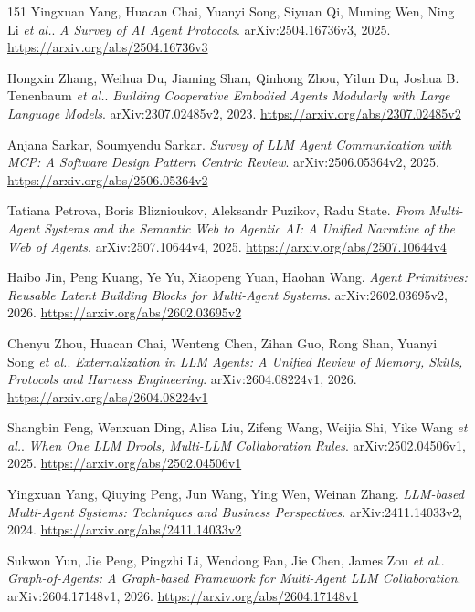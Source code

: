 \documentclass[11pt,a4paper]{article}
\begin{document}
\begin{thebibliography}{151}
Yingxuan Yang, Huacan Chai, Yuanyi Song, Siyuan Qi, Muning Wen, Ning Li \emph{et al.}.
\newblock \emph{A Survey of AI Agent Protocols}.
\newblock arXiv:2504.16736v3, 2025.
\newblock \url{https://arxiv.org/abs/2504.16736v3}

Hongxin Zhang, Weihua Du, Jiaming Shan, Qinhong Zhou, Yilun Du, Joshua B. Tenenbaum \emph{et al.}.
\newblock \emph{Building Cooperative Embodied Agents Modularly with Large Language Models}.
\newblock arXiv:2307.02485v2, 2023.
\newblock \url{https://arxiv.org/abs/2307.02485v2}

Anjana Sarkar, Soumyendu Sarkar.
\newblock \emph{Survey of LLM Agent Communication with MCP: A Software Design Pattern Centric Review}.
\newblock arXiv:2506.05364v2, 2025.
\newblock \url{https://arxiv.org/abs/2506.05364v2}

Tatiana Petrova, Boris Bliznioukov, Aleksandr Puzikov, Radu State.
\newblock \emph{From Multi-Agent Systems and the Semantic Web to Agentic AI: A Unified Narrative of the Web of Agents}.
\newblock arXiv:2507.10644v4, 2025.
\newblock \url{https://arxiv.org/abs/2507.10644v4}

Haibo Jin, Peng Kuang, Ye Yu, Xiaopeng Yuan, Haohan Wang.
\newblock \emph{Agent Primitives: Reusable Latent Building Blocks for Multi-Agent Systems}.
\newblock arXiv:2602.03695v2, 2026.
\newblock \url{https://arxiv.org/abs/2602.03695v2}

Chenyu Zhou, Huacan Chai, Wenteng Chen, Zihan Guo, Rong Shan, Yuanyi Song \emph{et al.}.
\newblock \emph{Externalization in LLM Agents: A Unified Review of Memory, Skills, Protocols and Harness Engineering}.
\newblock arXiv:2604.08224v1, 2026.
\newblock \url{https://arxiv.org/abs/2604.08224v1}

Shangbin Feng, Wenxuan Ding, Alisa Liu, Zifeng Wang, Weijia Shi, Yike Wang \emph{et al.}.
\newblock \emph{When One LLM Drools, Multi-LLM Collaboration Rules}.
\newblock arXiv:2502.04506v1, 2025.
\newblock \url{https://arxiv.org/abs/2502.04506v1}

Yingxuan Yang, Qiuying Peng, Jun Wang, Ying Wen, Weinan Zhang.
\newblock \emph{LLM-based Multi-Agent Systems: Techniques and Business Perspectives}.
\newblock arXiv:2411.14033v2, 2024.
\newblock \url{https://arxiv.org/abs/2411.14033v2}

Sukwon Yun, Jie Peng, Pingzhi Li, Wendong Fan, Jie Chen, James Zou \emph{et al.}.
\newblock \emph{Graph-of-Agents: A Graph-based Framework for Multi-Agent LLM Collaboration}.
\newblock arXiv:2604.17148v1, 2026.
\newblock \url{https://arxiv.org/abs/2604.17148v1}


\end{thebibliography}
\end{document}

